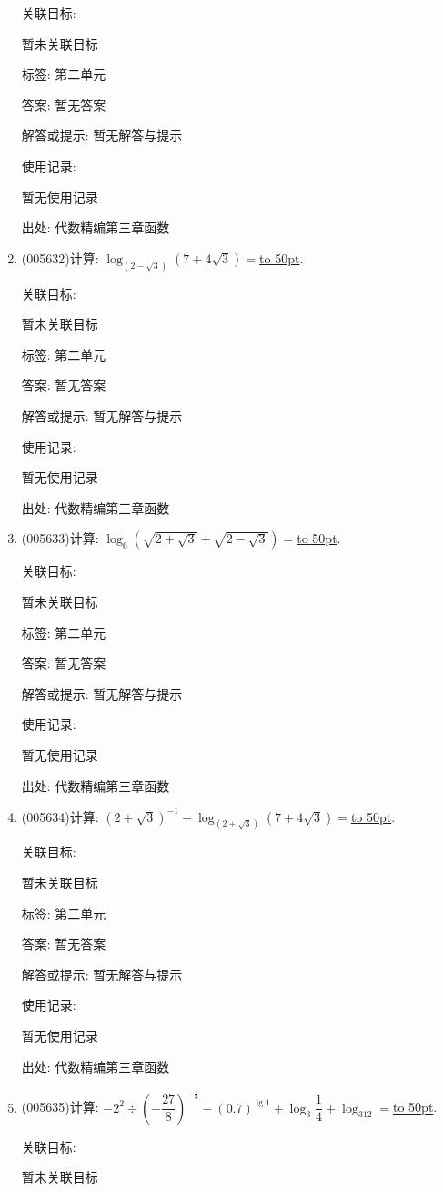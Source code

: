 \documentclass[10pt,a4paper]{article}
\newcommand{\blank}[1]{\underline{\hbox to #1pt{}}}
\begin{document}
\begin{enumerate}[1.]
关联目标:

暂未关联目标



标签: 第二单元

答案: 暂无答案

解答或提示: 暂无解答与提示

使用记录:

暂无使用记录


出处: 代数精编第三章函数
\item { (005632)}计算: $\log_{(2-\sqrt 3)}(7+4\sqrt 3)=$\blank{50}.


关联目标:

暂未关联目标



标签: 第二单元

答案: 暂无答案

解答或提示: 暂无解答与提示

使用记录:

暂无使用记录


出处: 代数精编第三章函数
\item { (005633)}计算: $\log_6(\sqrt {2+\sqrt 3}+\sqrt {2-\sqrt 3})=$\blank{50}.


关联目标:

暂未关联目标



标签: 第二单元

答案: 暂无答案

解答或提示: 暂无解答与提示

使用记录:

暂无使用记录


出处: 代数精编第三章函数
\item { (005634)}计算: $(2+\sqrt 3)^{-1}-\log_{(2+\sqrt 3)}(7+4\sqrt 3)=$\blank{50}.


关联目标:

暂未关联目标



标签: 第二单元

答案: 暂无答案

解答或提示: 暂无解答与提示

使用记录:

暂无使用记录


出处: 代数精编第三章函数
\item { (005635)}计算: $-2^2\div (-\dfrac{27}8)^{-\frac 13}-(0.7)^{\lg 1}+\log_3\dfrac 14+\log_312=$\blank{50}.


关联目标:

暂未关联目标




\end{enumerate}
\end{document}
